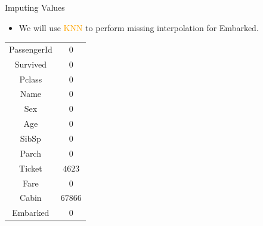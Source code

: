\documentclass[
size=14pt,
paper=smartboard,  %
mode=present, 		%
display=slides, 	%
style=tuliplab,  	%
pauseslide,
fleqn,leqno]{powerdot}
\begin{document}
	
	\begin{slide}{Imputing Values}
		
		\begin{itemize}
			\item
			We will use \textcolor{orange}{KNN} to perform missing interpolation for Embarked.
		\end{itemize}
		\begin{center}	\begin{tabular}{c|c}
				\toprule
				\midrule
				{PassengerId}
				&  {$0$} \\
				{Survived}
				&  {$0$} \\
				{Pclass}
				&  {$0$} \\
				{Name}
				&  {$0$} \\
				{Sex}
				&  {$0$} \\
				{Age}
				&  {$0$} \\
				{SibSp}
				&  {$0$} \\
				{Parch}
				&  {$0$} \\
				{Ticket}
				&  {$4623$} \\
				{Fare}
				&  {$0$} \\
				{Cabin}
				&  {$67866$} \\
				{Embarked}
				&  {$0$} \\
				\bottomrule
			\end{tabular}
		\end{center}
		
	\end{slide}
	
\end{document}
